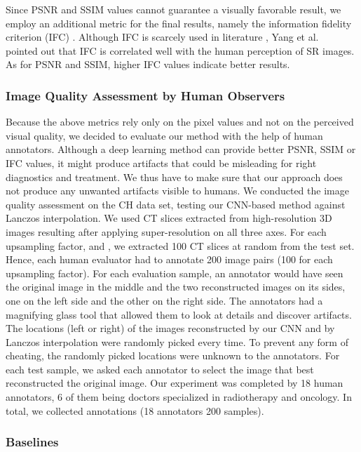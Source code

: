 \documentclass{ieeeaccess}
\begin{document}
Since PSNR and SSIM values cannot guarantee a visually favorable result, we employ an additional metric for the final results, namely the information fidelity criterion (IFC) \cite{Sheikh-TIP-2005}. Although IFC is scarcely used in literature \cite{You-TMI-2019}, Yang et al.~\cite{Yang-ECCV-2014} pointed out that IFC is correlated well with the human perception of SR images. As for PSNR and SSIM, higher IFC values indicate better results.

\subsubsection{Image Quality Assessment by Human Observers}

Because the above metrics rely only on the pixel values and not on the perceived visual quality, we decided to evaluate our method with the help of human annotators. Although a deep learning method can provide better PSNR, SSIM or IFC values, it might produce artifacts that could be misleading for right diagnostics and treatment. We thus have to make sure that our approach does not produce any unwanted artifacts visible to humans. We conducted the image quality assessment on the CH data set, testing our CNN-based method against Lanczos interpolation. We used CT slices extracted from high-resolution 3D images resulting after applying super-resolution on all three axes. For each upsampling factor,  and , we extracted 100 CT slices at random from the test set. Hence, each human evaluator had to annotate 200 image pairs (100 for each upsampling factor). For each evaluation sample, an annotator would have seen the original image in the middle and the two reconstructed images on its sides, one on the left side and the other on the right side. The annotators had a magnifying glass tool that allowed them to look at details and discover artifacts. The locations (left or right) of the images reconstructed by our CNN and by Lanczos interpolation were randomly picked every time. To prevent any form of cheating, the randomly picked locations were unknown to the annotators. For each test sample, we asked each annotator to select the image that best reconstructed the original image. Our experiment was completed by 18 human annotators, 6 of them being doctors specialized in radiotherapy and oncology. In total, we collected  annotations (18 annotators  200 samples).

\subsubsection{Baselines}
\end{document}
